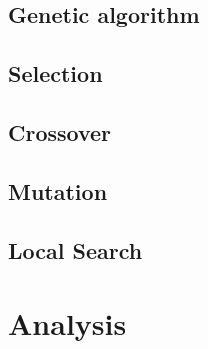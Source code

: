 \documentclass[oneside]{ctuthesis}
\theoremstyle{plain}
\theoremstyle{definition}
\theoremstyle{note}
\begin{document}
\subsection{Genetic algorithm}

\subsection{Selection}
\subsection{Crossover}
\subsection{Mutation}
\subsection{Local Search}

\section{Analysis}





\end{document}
